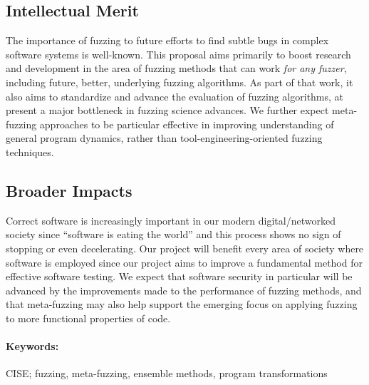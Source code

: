 \subsection*{Intellectual Merit} 
\vspace{-2mm}
The importance of fuzzing to future efforts to find subtle bugs in complex 
software systems is well-known.  This proposal aims primarily to boost research 
and development in the area of fuzzing methods that can work \emph{for any 
fuzzer}, including future, better, underlying fuzzing algorithms.  As part of 
that work, it also aims to standardize and advance the evaluation of fuzzing 
algorithms, at present a major bottleneck in fuzzing science advances.  We 
further expect meta-fuzzing approaches to be particular effective in improving 
understanding of general program dynamics, rather than 
tool-engineering-oriented fuzzing techniques.
\subsection*{Broader Impacts}
\vspace{-2mm}

Correct software is increasingly important in our modern digital/networked 
society since ``software is eating the world'' and this process shows no sign 
of stopping or even decelerating. 
Our project will benefit every area of society where software is employed since 
our project aims to improve a fundamental method for effective software testing.
We expect that software security in particular will be advanced by the 
improvements made to the performance of fuzzing methods, and that meta-fuzzing 
may also help support the emerging focus on applying fuzzing to more functional 
properties of code.

\paragraph{Keywords:}
CISE; fuzzing, meta-fuzzing, ensemble methods, program transformations
